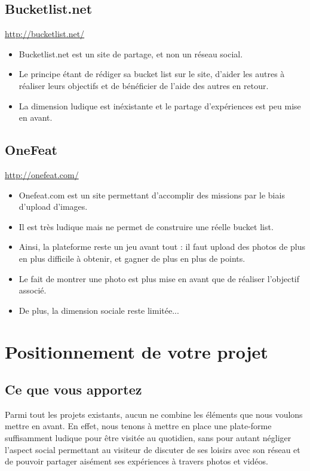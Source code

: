 \documentclass{life-fr}
\begin{document}
\section{Bucketlist.net}
\url{http://bucketlist.net/}

\begin{itemize}
  \item Bucketlist.net est un site de partage, et non un réseau social.
  \item Le principe étant de rédiger sa bucket list sur le site, d’aider les autres à réaliser leurs objectifs et de bénéficier de l’aide des autres en retour.
  \item La dimension ludique est inéxistante et le partage d’expériences est peu mise en avant.
\end{itemize}

\section{OneFeat}
\url{http://onefeat.com/}

\begin{itemize}
  \item Onefeat.com est un site permettant d’accomplir des missions par le biais d’upload d’images.
  \item Il est très ludique mais ne permet de construire une réelle bucket list.
  \item Ainsi, la plateforme reste un jeu avant tout : il faut upload des photos de plus en plus difficile à obtenir, et gagner de plus en plus de points.
  \item Le fait de montrer une photo est plus mise en avant que de réaliser l’objectif associé.
  \item De plus, la dimension sociale reste limitée...
\end{itemize}

\chapter{Positionnement de votre projet}

\section{Ce que vous apportez}

Parmi tout les projets existants, aucun ne combine les éléments que nous voulons mettre en avant. En effet, nous tenons à mettre en place une plate-forme suffisamment ludique pour être visitée au quotidien, sans pour autant négliger l’aspect social permettant au visiteur de discuter de ses loisirs avec son réseau et de pouvoir partager aisément ses expériences à travers photos et vidéos.
\end{document}
